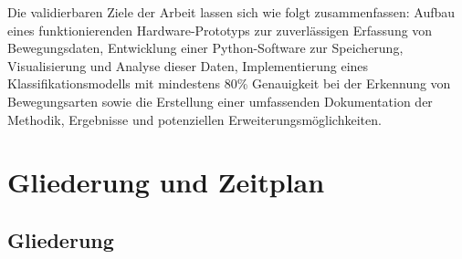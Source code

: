 \documentclass{scrartcl}
\begin{document}
Die validierbaren Ziele der Arbeit lassen sich wie folgt zusammenfassen: Aufbau eines funktionierenden Hardware-Prototyps zur zuverlässigen Erfassung von Bewegungsdaten, Entwicklung einer Python-Software zur Speicherung, Visualisierung und Analyse dieser Daten, Implementierung eines Klassifikationsmodells mit mindestens 80\% Genauigkeit bei der Erkennung von Bewegungsarten sowie die Erstellung einer umfassenden Dokumentation der Methodik, Ergebnisse und potenziellen Erweiterungsmöglichkeiten.

\section{Gliederung und Zeitplan}
\subsection*{Gliederung}
\end{document}
